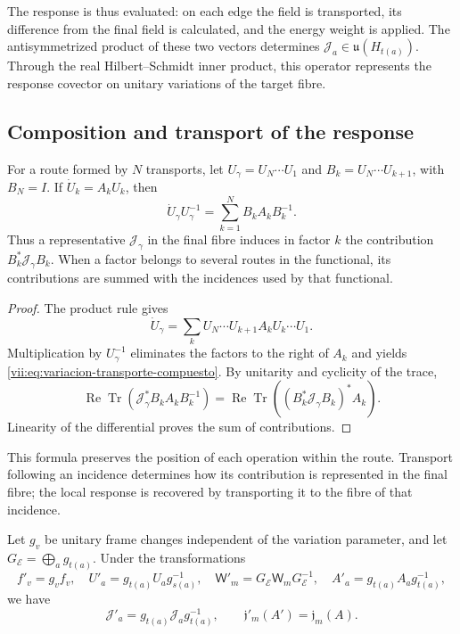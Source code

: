 The response is thus evaluated: on each edge the field is transported,
its difference from the final field is calculated, and the energy weight is applied.
The antisymmetrized product of these two vectors determines
\(\mathcal J_a\in\mathfrak u(H_{t(a)})\). Through the real
Hilbert--Schmidt inner product, this operator represents the response covector
on unitary variations of the target fibre.

\subsection{Composition and transport of the response}
\label{vii:subsec:composicion-respuesta}

\begin{proposition}
\label{vii:prop:composicion-respuesta}
For a route formed by \(N\) transports, let
\(U_\gamma=U_N\cdots U_1\) and
\(B_k=U_N\cdots U_{k+1}\), with \(B_N=I\).
If \(\dot U_k=A_kU_k\), then
\begin{equation}
 \dot U_\gamma U_\gamma^{-1}
 =\sum_{k=1}^N B_kA_kB_k^{-1}.
 \label{vii:eq:variacion-transporte-compuesto}
\end{equation}
Thus a representative \(\mathcal J_\gamma\) in the final fibre
induces in factor \(k\) the contribution
\(B_k^*\mathcal J_\gamma B_k\). When a factor belongs to several
routes in the functional, its contributions are summed with the incidences
used by that functional.
\end{proposition}

\begin{proof}
The product rule gives
\[
 \dot U_\gamma=\sum_k
 U_N\cdots U_{k+1}A_kU_k\cdots U_1.
\]
Multiplication by \(U_\gamma^{-1}\) eliminates the factors to the right
of \(A_k\) and yields \eqref{vii:eq:variacion-transporte-compuesto}.
By unitarity and cyclicity of the trace,
\[
 \operatorname{Re}\operatorname{Tr}
   (\mathcal J_\gamma^*B_kA_kB_k^{-1})
 =\operatorname{Re}\operatorname{Tr}
   ((B_k^*\mathcal J_\gamma B_k)^*A_k).
\]
Linearity of the differential proves the sum of contributions.
\end{proof}

This formula preserves the position of each operation within the route.
Transport following an incidence determines how its contribution is represented
in the final fibre; the local response is recovered by
transporting it to the fibre of that incidence.

\begin{proposition}
\label{vii:prop:covariancia-corriente-memoria}
Let \(g_v\) be unitary frame changes independent of the variation
parameter, and let \(G_{\mathcal E}=\bigoplus_a g_{t(a)}\).
Under the transformations
\[
 f'_v=g_vf_v,\quad U'_a=g_{t(a)}U_ag_{s(a)}^{-1},\quad
 \mathsf W'_m=G_{\mathcal E}\mathsf W_mG_{\mathcal E}^{-1},\quad
 A'_a=g_{t(a)}A_ag_{t(a)}^{-1},
\]
we have
\begin{equation}
 \mathcal J'_a=g_{t(a)}\mathcal J_ag_{t(a)}^{-1},
 \qquad \mathfrak j'_m(A')=\mathfrak j_m(A).
 \label{vii:eq:covariancia-respuesta}
\end{equation}
\end{proposition}

